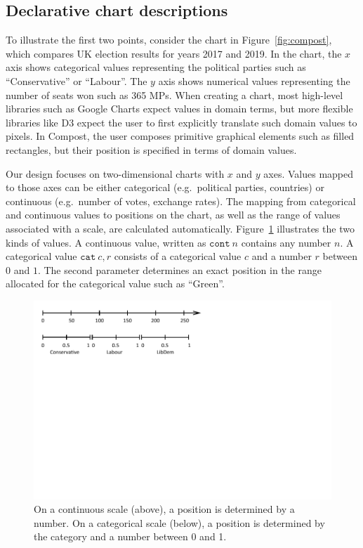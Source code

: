 \documentclass[fleqn,11pt]{report}
\theoremstyle{definition}
\begin{document}
\subsection{Declarative chart descriptions}

To illustrate the first two points, consider the chart in Figure~\ref{fig:compost}, which
compares UK election results for years 2017 and 2019. In the chart, the $x$ axis shows categorical
values representing the political parties such as ``Conservative'' or ``Labour''. The
$y$ axis shows numerical values representing the number of seats won such as 365 MPs.
When creating a chart, most high-level libraries such as Google Charts expect values in domain
terms, but more flexible libraries like D3 expect the user to first explicitly translate
such domain values to pixels. In Compost, the user composes primitive graphical elements such
as filled rectangles, but their position is specified in terms of domain values.

Our design focuses on two-dimensional charts with $x$ and $y$ axes. Values mapped to those axes
can be either categorical (e.g.~political parties, countries) or continuous
(e.g.~number of votes, exchange rates). The mapping from categorical and continuous values
to positions on the chart, as well as the range of values associated with a scale,
are calculated automatically. Figure~\ref{fig:scales} illustrates the
two kinds of values. A continuous value, written as $\texttt{cont}~n$ contains any number $n$.
A categorical value $\texttt{cat}~c, r$ consists of a categorical value $c$ and a number $r$ between
$0$ and $1$. The second parameter determines an exact position in the range allocated for the
categorical value such as ``Green''.

\begin{figure}[t]
  \vspace{-1em}
  \centering\includegraphics[scale=0.95,trim=0cm 7cm 6cm 0cm,clip]{img/values.pdf}
  \caption{On a continuous scale (above), a position is determined by a number. On a
  categorical scale (below), a position is determined by the category and a number
  between 0 and 1.}
  \label{fig:scales}
\end{figure}
\end{document}
